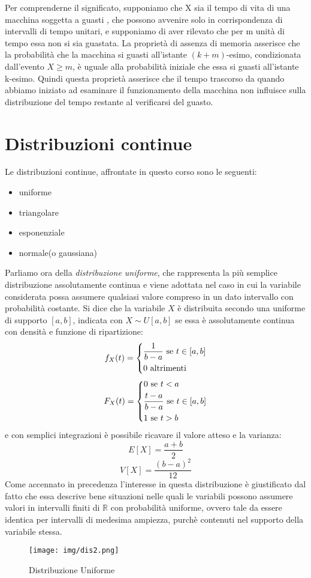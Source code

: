 \documentclass[a4paper,12pt, oneside]{book}
\newcommand{\numberset}{\mathbb}
\newcommand{\R}{\numberset{R}}
\begin{document}
Per comprenderne il significato, supponiamo che X sia il tempo di vita di una macchina soggetta a guasti
, che possono avvenire solo in corrispondenza di intervalli di tempo unitari, e supponiamo di aver rilevato
che per m unità di tempo essa non si sia guastata.\newline
La proprietà di assenza di memoria asserisce che la probabilità che la macchina si guasti all'istante $(k+m)$-esimo,
condizionata dall'evento $X \geq m$, è uguale alla probabilità iniziale che essa si guasti all'istante k-esimo.\newline
Quindi questa proprietà asserisce che il tempo trascorso da quando abbiamo iniziato ad esaminare il funzionamento
della macchina non influisce sulla distribuzione del tempo restante al verificarsi del guasto.

\section{Distribuzioni continue}
Le distribuzioni continue, affrontate in questo corso sono le seguenti:
\begin{itemize}
    \item uniforme
    \item triangolare
    \item esponenziale
    \item normale(o gaussiana)
\end{itemize}
Parliamo ora della \emph{distribuzione uniforme}, che rappresenta la più semplice distribuzione assolutamente continua
e viene adottata nel caso in cui la variabile considerata possa assumere qualsiasi valore compreso
in un dato intervallo con probabilità costante.\newline
Si dice che la variabile $X$ è distribuita secondo una uniforme di supporto $[a,b]$, indicata con $X \sim U[a, b]$
se essa è assolutamente continua con densità e funzione di ripartizione:
\[f_X(t) = \begin{dcases}
            \frac{1}{b-a} \mbox{ se } t \in [a,b]\\
            0             \mbox{ altrimenti}\\
           \end{dcases}\]
\[F_X(t) = \begin{dcases}
            0 \mbox{ se } t < a\\
            \frac{t-a}{b-a} \mbox{ se } t \in [a,b]\\
            1 \mbox{ se } t > b\\
            \end{dcases}\]
e con semplici integrazioni è possibile ricavare il valore atteso e la varianza:
\[E[X] = \frac{a+b}{2}\]
\[V[X] = \frac{(b-a)^2}{12}\]
Come accennato in precedenza l'interesse in questa distribuzione è giustificato dal fatto che essa descrive bene
situazioni nelle quali le variabili possono assumere valori in intervalli finiti di $\R$ con probabilità uniforme,
ovvero tale da essere identica per intervalli di medesima ampiezza, purchè contenuti nel supporto della variabile stessa.
\begin{figure}
    \caption{Distribuzione Uniforme}
    \label{img:uniforme}
	\texttt{[image: img/dis2.png]}
\end{figure}
\end{document}
